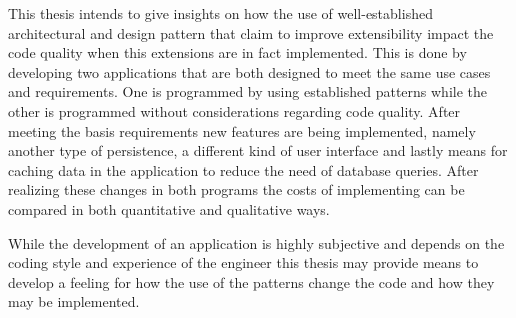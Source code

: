 This thesis intends to give insights on how the use of well-established architectural and design pattern that claim to improve extensibility impact the code quality when this extensions are in fact implemented. This is done by developing two applications that are both designed to meet the same use cases and requirements. One is programmed by using established patterns while the other is programmed without considerations regarding code quality. 
After meeting the basis requirements new features are being implemented, namely another type of persistence, a different kind of user interface and lastly means for caching data in the application to reduce the need of database queries. After realizing these changes in both programs the costs of implementing can be compared in both quantitative and qualitative ways. 

While the development of an application is highly subjective and depends on the coding style and experience of the engineer this thesis may provide means to develop a feeling for how the use of the patterns change the code and how they may be implemented.  